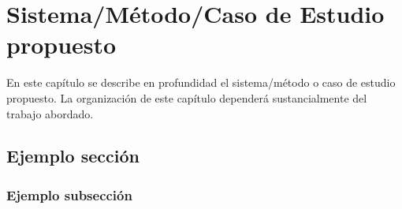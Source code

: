
\chapter{Sistema/Método/Caso de Estudio propuesto}
\label{ch:Sistema_Metodo_Caso_de_Estudio}

\noindent En este capítulo se describe en profundidad el sistema/método o caso de estudio propuesto. La organización de este capítulo dependerá sustancialmente del trabajo abordado.


\section{Ejemplo sección}
\label{sec:Ejemplo_seccion}

\subsection{Ejemplo subsección}
\label{sec:Ejemplo_subSeccion}